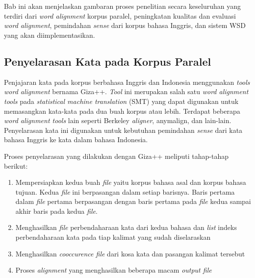 \chapter{\babTiga}
Bab ini akan menjelaskan gambaran proses penelitian secara keseluruhan yang terdiri dari \textit{word alignment} korpus paralel, peningkatan kualitas dan evaluasi \textit{word alignment}, pemindahan \textit{sense} dari korpus bahasa Inggris, dan sistem WSD yang akan diimplementasikan.

\section{Penyelarasan Kata pada Korpus Paralel}
Penjajaran kata pada korpus berbahasa Inggris dan Indonesia menggunakan \textit{tools word alignment} bernama Giza++. \textit{Tool} ini merupakan salah satu \textit{word alignment tools} pada \textit{statistical machine translation} (SMT) yang dapat digunakan untuk memasangkan kata-kata pada dua buah korpus atau lebih. Terdapat beberapa \textit{word alignment tools} lain seperti Berkeley \textit{aligner}, anymalign, dan lain-lain. Penyelarasan kata ini digunakan untuk kebutuhan pemindahan \textit{sense} dari kata bahasa Inggris ke kata dalam bahasa Indonesia.

Proses penyelarasan yang dilakukan dengan Giza++ meliputi tahap-tahap berikut:
\begin{enumerate}
	\item Mempersiapkan kedua buah \textit{file} yaitu korpus bahasa asal dan korpus bahasa tujuan. Kedua \textit{file} ini berpasangan dalam setiap barisnya. Baris pertama dalam \textit{file} pertama berpasangan dengan baris pertama pada \textit{file} kedua sampai akhir baris pada kedua \textit{file}.
	\item Menghasilkan \textit{file} perbendaharaan kata dari kedua bahasa dan \textit{list} indeks perbendaharaan kata pada tiap kalimat yang sudah diselaraskan
	\item Menghasilkan \textit{cooccurence file} dari kosa kata dan pasangan kalimat tersebut
	\item Proses \textit{alignment} yang menghasilkan beberapa macam \textit{output file} 
\end{enumerate}

